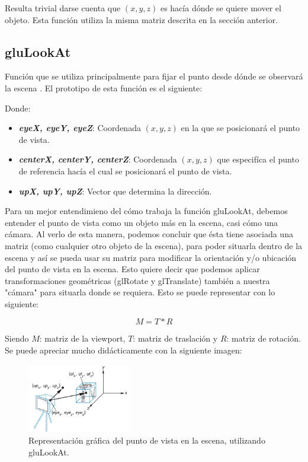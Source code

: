 \documentclass[journal]{IEEEtran}
\begin{document}
Resulta trivial darse cuenta que $(x,y,z)$ es hacía dónde se quiere mover el objeto. Esta función utiliza la misma matriz descrita en la sección anterior.

\subsection{gluLookAt}

Función que se utiliza principalmente para fijar el punto desde dónde se observará la escena \cite{glulookat}. El prototipo de esta función es el siguiente:



Donde:

\begin{itemize}
	\item \textbf{\textit{eyeX, eyeY, eyeZ}}: Coordenada $(x,y,z)$ en la que se posicionará el punto de vista.
	\item \textbf{\textit{centerX, centerY, centerZ}}: Coordenada $(x,y,z)$ que especifíca el punto de referencia hacía el cual se posicionará el punto de vista.
	\item \textbf{\textit{upX, upY, upZ}}: Vector que determina la dirección.
\end{itemize}
                
Para un mejor entendimieno del cómo trabaja la función gluLookAt, debemos entender el punto de vista como un objeto más en la escena, casi cómo una cámara. Al verlo de esta manera, podemos concluir que ésta tiene asociada una matriz (como cualquier otro objeto de la escena), para poder situarla dentro de la escena y así se pueda usar su matriz para modificar la orientación y/o ubicación del punto de vista en la escena. Esto quiere decir que podemos aplicar transformaciones geométricas (glRotate y glTranslate) también a nuestra "cámara" para situarla donde se requiera. Esto se puede representar con lo siguiente:

\[
	M = T * R
\]

Siendo $M$: matriz de la viewport, $T$: matriz de traslación y $R$: matriz de rotación. Se puede apreciar mucho didácticamente con la siguiente imagen:

\begin{figure}[h!]
	\includegraphics[width=0.4\textwidth, height=0.25\textwidth]{viewport.png}
	\centering
	\caption{Representación gráfica del punto de vista en la escena, utilizando gluLookAt.}
\end{figure}
\end{document}

